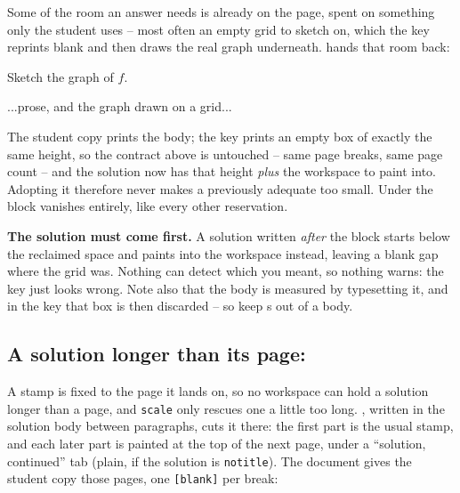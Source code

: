 Some of the room an answer needs is already on the page, spent on something
only the student uses -- most often an empty grid to sketch on, which the key
reprints blank and then draws the real graph underneath. 
hands that room back:

\begin{manexsource}
\begin{problem}
  Sketch the graph of $f$.
  \begin{solution}          %
    ...prose, and the graph drawn on a grid...
  \end{solution}
  \begin{studentonly}       %
    \PWgrid{}
  \end{studentonly}
\end{problem}
\workspace[10]
\end{manexsource}

The student copy prints the body; the key prints an empty box of exactly the
same height, so the contract above is untouched -- same page breaks, same page
count -- and the solution now has that height \emph{plus} the workspace to
paint into. Adopting it therefore never makes a previously adequate
 too small. Under  the block vanishes
entirely, like every other reservation.

\textbf{The solution must come first.} A solution written \emph{after} the
block starts below the reclaimed space and paints into the workspace instead,
leaving a blank gap where the grid was. Nothing can detect which you meant, so
nothing warns: the key just looks wrong. Note also that the body is measured
by typesetting it, and in the key that box is then discarded -- so keep
s out of a  body.

\subsection{A solution longer than its page: }

A stamp is fixed to the page it lands on, so no workspace can hold a solution longer than a page, and \texttt{scale} only rescues one a little too long.
, written in the solution body between paragraphs, cuts it there: the first part is the usual stamp, and each later part is painted at the top of the next page, under a ``solution, continued'' tab (plain, if the solution is \texttt{notitle}).
The document gives the student copy those pages, one \texttt{[blank]} per break:

